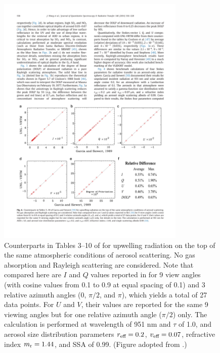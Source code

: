 \begin{figure}[t]
  \centering
  \includegraphics[width={0.8\textwidth}]{figures/unlvrtm3.pdf}
  \caption{Counterparts in Tables 3--10 of \citet{Garcia89} for
upwelling radiation on the top of the same atmospheric conditions of
aerosol scattering. No gas absorption and Rayleigh scattering are
considered. Note that compared here are $I$ and $Q$ values reported 
in \citet{Garcia89} for 9 view angles (with cosine values from 0.1 
to 0.9 at equal spacing of 0.1) and 3 relative azimuth angles 
(0, $\pi/2$, and $\pi$), which yields a total of 27 data points. 
For $U$ and $V$, their values are reported for the same 9 viewing angles 
but for one relative azimuth angle ($\pi/2$) only. 
The calculation is performed at wavelength of 951 nm and $\tau$ of 1.0, 
and aerosol size distribution parameters $r_\text{eff}=0.2$, 
$v_\text{eff}=0.07$, refractive index $m_\text{r}=1.44$, and SSA of 0.99.
(Figure adopted from \citet{Wang14}.)}
  \label{fig:unlvrtm3}
\end{figure}

